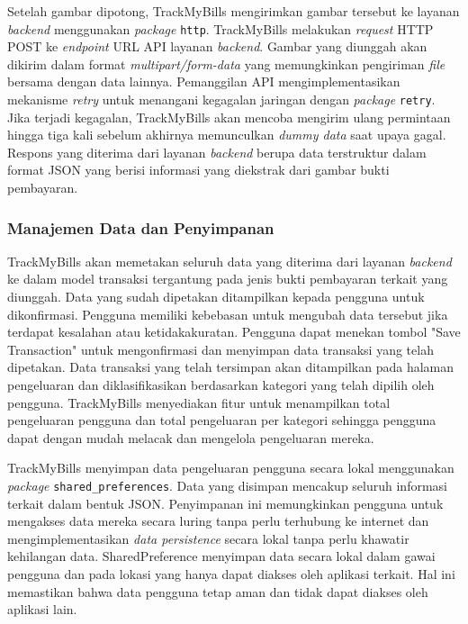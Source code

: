 Setelah gambar dipotong, TrackMyBills mengirimkan gambar tersebut ke layanan \emph{backend} menggunakan \emph{package} \texttt{http}. TrackMyBills melakukan \emph{request} HTTP POST ke \emph{endpoint} URL API layanan \emph{backend}. Gambar yang diunggah akan dikirim dalam format \emph{multipart/form-data} yang memungkinkan pengiriman \emph{file} bersama dengan data lainnya. Pemanggilan API mengimplementasikan mekanisme \emph{retry} untuk menangani kegagalan jaringan dengan \emph{package} \texttt{retry}. Jika terjadi kegagalan, TrackMyBills akan mencoba mengirim ulang permintaan hingga tiga kali sebelum akhirnya memunculkan \emph{dummy data} saat upaya gagal. Respons yang diterima dari layanan \emph{backend} berupa data terstruktur dalam format JSON yang berisi informasi yang diekstrak dari gambar bukti pembayaran.

\subsubsection{Manajemen Data dan Penyimpanan}
\label{subsubsec:manajemen-data-dan-penyimpanan}

TrackMyBills akan memetakan seluruh data yang diterima dari layanan \emph{backend} ke dalam model transaksi tergantung pada jenis bukti pembayaran terkait yang diunggah. Data yang sudah dipetakan ditampilkan kepada pengguna untuk dikonfirmasi. Pengguna memiliki kebebasan untuk mengubah data tersebut jika terdapat kesalahan atau ketidakakuratan. Pengguna dapat menekan tombol "Save Transaction" untuk mengonfirmasi dan menyimpan data transaksi yang telah dipetakan. Data transaksi yang telah tersimpan akan ditampilkan pada halaman pengeluaran dan diklasifikasikan berdasarkan kategori yang telah dipilih oleh pengguna. TrackMyBills menyediakan fitur untuk menampilkan total pengeluaran pengguna dan total pengeluaran per kategori sehingga pengguna dapat dengan mudah melacak dan mengelola pengeluaran mereka.

TrackMyBills menyimpan data pengeluaran pengguna secara lokal menggunakan \emph{package} \texttt{shared\_preferences}. Data yang disimpan mencakup seluruh informasi terkait dalam bentuk JSON. Penyimpanan ini memungkinkan pengguna untuk mengakses data mereka secara luring tanpa perlu terhubung ke internet dan mengimplementasikan \emph{data persistence} secara lokal tanpa perlu khawatir kehilangan data. SharedPreference menyimpan data secara lokal dalam gawai pengguna dan pada lokasi yang hanya dapat diakses oleh aplikasi terkait. Hal ini memastikan bahwa data pengguna tetap aman dan tidak dapat diakses oleh aplikasi lain.

